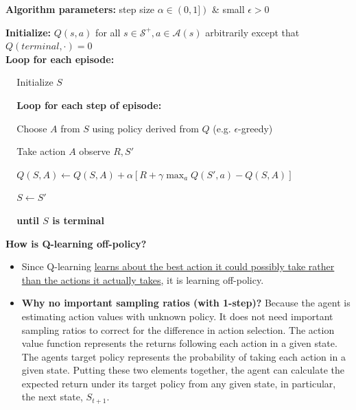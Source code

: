 \documentclass[12pt, a4paper]{article}
\begin{document}
\begin{tcolorbox}[title={Q-learning (off-policy TD control) for estimating $\pi \approx \pi_*$}]

\textbf{Algorithm parameters:} step size $\alpha \in (0,1])$ \& small $\epsilon > 0$

\textbf{Initialize:} $Q(s, a)$ for all $s \in \mathcal{S}^+, a \in \mathcal{A}(s)$ arbitrarily except that $Q(terminal, \cdot) = 0$ \\

\textbf{Loop for each episode:}
\begin{description}
   \item $\;\;\;$ Initialize $S$
   \item $\;\;\;$ \textbf{Loop for each step of episode:}
   \begin{description}
     \item $\;\;\;$ Choose $A$ from $S$ using policy derived from $Q$ (e.g. $\epsilon$-greedy)
     \item $\;\;\;$ Take action $A$ observe $R, S'$
     \item $\;\;\;$ $Q(S, A) \leftarrow Q(S, A) + \alpha [R + \gamma \max_a Q(S', a) - Q(S, A)]$
     \item $\;\;\;$ $S \leftarrow S'$
   \end{description}
   \item $\;\;\;$ \textbf{until $S$ is terminal}
\end{description}
\end{tcolorbox}


\bigskip

\textbf{How is Q-learning off-policy?}
\begin{itemize}
  \item Since Q-learning \uline{learns about the best action it could possibly take rather than the actions it actually takes}, it is learning off-policy.
  \item \textbf{Why no important sampling ratios (with 1-step)?} Because the agent is estimating action values with unknown policy. It does not need important sampling ratios to correct for the difference in action selection. The action value function represents the returns following each action in a given state. The agents target policy represents the probability of taking each action in a given state. Putting these two elements together, the agent can calculate the expected return under its target policy from any given state, in particular, the next state, $S_{t+1}$.

\end{itemize}
\end{document}
